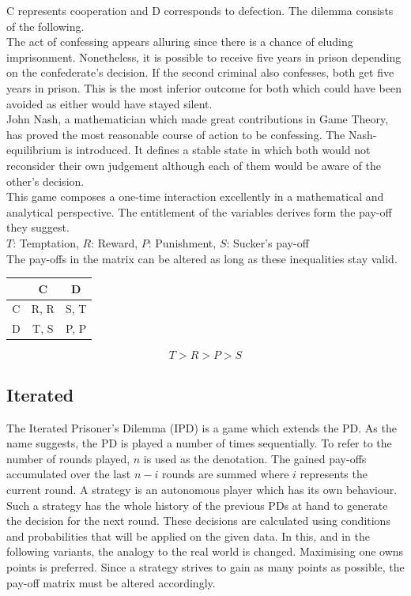 \documentclass{article}
\begin{document}
\noindent
C represents cooperation and D corresponds to defection. 
The dilemma consists of the following.\\
The act of confessing appears alluring since there is a chance of eluding imprisonment.
Nonetheless, it is possible to receive five years in prison depending on the confederate's decision.
If the second criminal also confesses, both get five years in prison. 
This is the most inferior outcome for both which could have been avoided as either would have stayed silent.\\
John Nash, a mathematician which made great contributions in Game Theory, has proved the most reasonable course of action to be confessing.
The Nash-equilibrium is introduced. 
It defines a stable state in which both would not reconsider their own judgement although each of them would be aware of the other's decision.\\
This game composes a one-time interaction excellently in a mathematical and analytical perspective. 
The entitlement of the variables derives form the pay-off they suggest.\\
$T$: Temptation,
$R$: Reward,
$P$: Punishment,
$S$: Sucker's pay-off\\
The pay-offs in the matrix can be altered as long as these inequalities stay valid.

\begin{center}
\begin{tabular}{ c|c|c }
   & C & D \\ 
   \hline
 C & R, R & S, T\\  
   \hline
 D & T, S & P, P
\end{tabular}
\end{center}

$$T > R > P > S$$

\subsection{Iterated}
		
The Iterated Prisoner's Dilemma (IPD) is a game which extends the PD. 
As the name suggests, the PD is played a number of times sequentially. 
To refer to the number of rounds played, $n$ is used as the denotation. 
The gained pay-offs accumulated over the last $n-i$ rounds are summed where $i$ represents the current round.
A strategy is an autonomous player which has its own behaviour.
Such a strategy has the whole history of the previous PDs at hand to generate the decision for the next round.
These decisions are calculated using conditions and probabilities that will be applied on the given data.
In this, and in the following variants, the analogy to the real world is changed.
Maximising one owns points is preferred.
Since a strategy strives to gain as many points as possible, the pay-off matrix must be altered accordingly.\\
\end{document}
